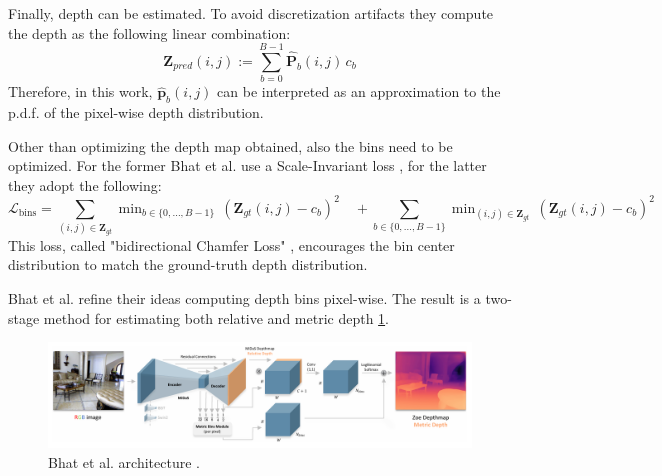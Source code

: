 Finally, depth can be estimated.
To avoid discretization artifacts they compute the depth as the following linear combination:
\[
	\mathbf{Z}_{pred}(i,j) := \sum_{b=0}^{B-1} \hat{\mathbf{P}}_{b}(i,j) \, c_{b}
\]
Therefore, in this work, $\hat{\mathbf{p}}_{b}(i,j)$ can be interpreted as an approximation to the p.d.f. of the pixel-wise depth distribution.

Other than optimizing the depth map obtained, also the bins need to be optimized.
For the former Bhat et al. use a Scale-Invariant loss \cite{Eigen}, for the latter they adopt the following:
\[
	\mathcal{L}_{\text{bins}} =
	\sum_{(i,j) \in \mathbf{Z}_{gt}} \mathop{\text{min}}_{b \in \{0, \dotsc, B-1\}} \, (\mathbf{Z}_{gt}(i,j) - c_{b})^{2} \quad+
	\sum_{b \in \{0, \dotsc, B-1\}} \mathop{\text{min}}_{(i,j) \in \mathbf{Z}_{gt}} \, (\mathbf{Z}_{gt}(i,j) - c_{b})^{2}
\]
This loss, called "bidirectional Chamfer Loss" \cite{AdaBins}, encourages the bin center distribution to match the ground-truth depth distribution.

Bhat et al. \cite{ZoeDepth} refine their ideas computing depth bins pixel-wise.
The result is a two-stage method for estimating both relative and metric depth \ref{fig:zoe_depth}.

\begin{figure}
	\centering
	\includegraphics[scale=0.5]{figs/zoe_depth}
	\caption{Bhat et al. architecture \cite{ZoeDepth}. \label{fig:zoe_depth}}
\end{figure}

